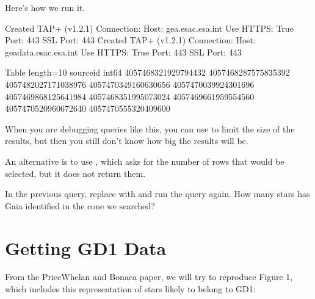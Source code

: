 \documentclass[letterpaper,10pt,english]{sphinxmanual}
\begin{document}
Here’s how we run it.

\begin{sphinxVerbatim}[commandchars=\\\{\}]
   

  
  
\end{sphinxVerbatim}

\begin{sphinxVerbatim}[commandchars=\\\{\}]
Created TAP+ (v1.2.1) \PYGZhy{} Connection:
	Host: gea.esac.esa.int
	Use HTTPS: True
	Port: 443
	SSL Port: 443
Created TAP+ (v1.2.1) \PYGZhy{} Connection:
	Host: geadata.esac.esa.int
	Use HTTPS: True
	Port: 443
	SSL Port: 443
\end{sphinxVerbatim}

\begin{sphinxVerbatim}[commandchars=\\\{\}]
\PYGZlt{}Table length=10\PYGZgt{}
     source\PYGZus{}id     
       int64       
\PYGZhy{}\PYGZhy{}\PYGZhy{}\PYGZhy{}\PYGZhy{}\PYGZhy{}\PYGZhy{}\PYGZhy{}\PYGZhy{}\PYGZhy{}\PYGZhy{}\PYGZhy{}\PYGZhy{}\PYGZhy{}\PYGZhy{}\PYGZhy{}\PYGZhy{}\PYGZhy{}\PYGZhy{}
4057468321929794432
4057468287575835392
4057482027171038976
4057470349160630656
4057470039924301696
4057469868125641984
4057468351995073024
4057469661959554560
4057470520960672640
4057470555320409600
\end{sphinxVerbatim}

 When you are debugging queries like this, you can use  to limit the size of the results, but then you still don’t know how big the results will be.

An alternative is to use , which asks for the number of rows that would be selected, but it does not return them.

In the previous query, replace  with  and run the query again.  How many stars has Gaia identified in the cone we searched?


\section{Getting GD\sphinxhyphen{}1 Data}
\label{\detokenize{02_coords:getting-gd-1-data}}
From the Price\sphinxhyphen{}Whelan and Bonaca paper, we will try to reproduce Figure 1, which includes this representation of stars likely to belong to GD\sphinxhyphen{}1:
\end{document}
